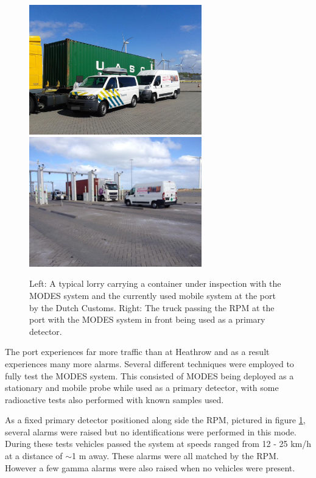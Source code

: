 \begin{figure}
\begin{center}
\includegraphics[width=75mm]{./Chapter7/figures/rotterdamContainer1.jpg}
\includegraphics[width=75mm]{./Chapter7/figures/rotterdamRPM1.jpg}
\end{center}
\caption{Left: A typical lorry carrying a container under inspection with the MODES system and the currently used mobile system at the port by the Dutch Customs. Right: The truck passing the RPM at the port with the MODES system in front being used as a primary detector.}
\label{fig:rotterdamContainer1}
\end{figure}

The port experiences far more traffic than at Heathrow and as a result experiences many more alarms. Several different techniques were employed to fully test the MODES system. This consisted of MODES being deployed as a stationary and mobile probe while used as a primary detector, with some radioactive tests also performed with known samples used. 

As a fixed primary detector positioned along side the RPM, pictured in figure \ref{fig:rotterdamContainer1}, several alarms were raised but no identifications were performed in this mode. During these tests vehicles passed the system at speeds ranged from 12 - 25 km/h at a distance of $\sim$1 m away. These alarms were all matched by the RPM. However a few gamma alarms were also raised when no vehicles were present. 

